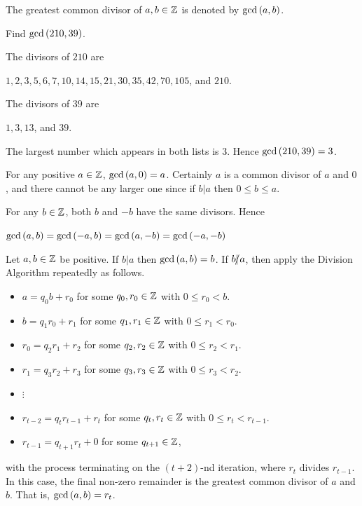 \documentclass[11pt,fleqn,dvipsnames,usenames]{article}
\newcommand{\p}{\noindent}
\begin{document}
\notation The greatest common divisor of $a,b\in\mathbb{Z}$ is denoted by $\text{gcd}\left(a,b\right)$.
\vsp

\begin{example}
Find $\text{gcd}\left(210,39\right)$.
\end{example}

\solution The divisors of $210$ are
\begin{center}
$1,2,3,5,6,7,10, 14, 15, 21, 30, 35, 42, 70, 105$, and $210$.
\end{center}
The divisors of $39$ are
\begin{center}
$1,3,13$, and $39$.
\end{center}
\p The largest number which appears in both lists is $3$.  Hence $\text{gcd}\left(210,39\right) = 3$.
\vsp

\begin{example}
For any positive $a\in\mathbb{Z}$, $\text{gcd}\left(a,0\right) = a$.  Certainly $a$ is a common divisor of $a$ and $0$, and there cannot be any larger one since if $b|a$ then $0\leq b\leq a$.
\end{example}

\note For any $b\in\mathbb{Z}$, both $b$ and $-b$ have the same divisors.  Hence
\begin{center}
$\text{gcd}\left(a,b\right) = \text{gcd}\left(-a,b\right) = \text{gcd}\left(a,-b\right) = \text{gcd}\left(-a,-b\right)$
\end{center}
\newpage

\begin{theorem}\label{euclideanalg}
Let $a,b\in\mathbb{Z}$ be positive.  If $b|a$ then $\text{gcd}\left(a,b\right) = b$.  If $b|\kern-0.9ex{/} a$, then apply the Division Algorithm repeatedly as follows.

\begin{itemize}[\ ]
\item $a = q_{0}b + r_{0}$ for some $q_{0},r_{0}\in\mathbb{Z}$ with $0 \leq r_{0} < b$.
\item $b = q_{1}r_{0} + r_{1}$ for some $q_{1},r_{1}\in\mathbb{Z}$ with $0 \leq r_{1} < r_{0}$.
\item $r_{0} = q_{2}r_{1} + r_{2}$ for some $q_{2},r_{2}\in\mathbb{Z}$ with $0 \leq r_{2} < r_{1}$.
\item $r_{1} = q_{3}r_{2} + r_{3}$ for some $q_{3},r_{3}\in\mathbb{Z}$ with $0 \leq r_{3} < r_{2}$.
\item {}$\vdots$
\item $r_{t-2} = q_{t}r_{t-1} + r_{t}$ for some $q_{t},r_{t}\in\mathbb{Z}$ with $0 \leq r_{t} < r_{t-1}$.
\item $r_{t-1} = q_{t+1}r_{t} + 0$ for some $q_{t+1}\in\mathbb{Z}$,
\end{itemize}
with the process terminating on the $(t+2)$-nd iteration, where $r_{t}$ divides $r_{t-1}$.  In this case, the final non-zero remainder is the greatest common divisor of $a$ and $b$.  That is, $\text{gcd}\left(a,b\right) = r_{t}$.
\end{theorem}
\vsp
\end{document}
